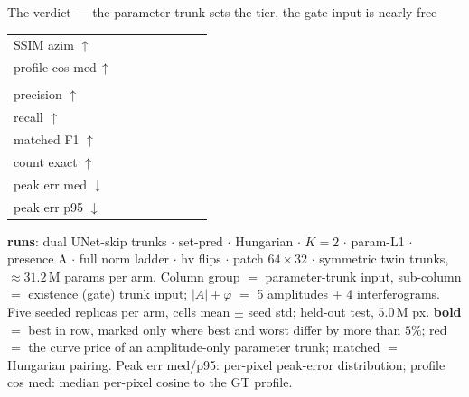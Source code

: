 \begin{frame}{The verdict --- the parameter trunk sets the tier, the gate input is nearly free}
\begin{tabular}{@{}l ccc !{\hspace{9pt}} cc !{\hspace{9pt}} cc@{}}
    SSIM azim $\uparrow$ &  &  &  &  &  &  &  \\
    profile cos med\,$\uparrow$ &  &  &  &  &  &  &  \\
    \addlinespace
     \\
    precision $\uparrow$ &  &  &  &  &  &  &  \\
    recall $\uparrow$ &  &  &  &  &  &  &  \\
    matched F1 $\uparrow$ &  &  &  &  &  &  &  \\
    count exact $\uparrow$ &  &  &  &  &  &  &  \\
    peak err med $\downarrow$ &  &  &  &  &  &  &  \\
    peak err p95 $\downarrow$ &  &  &  &  &  &  &  \\
    \bottomrule
    \end{tabular}
  \par\vspace{3pt}
  \parbox{0.82\textwidth}{\tiny\color{soft} \textbf{runs}: dual UNet-skip trunks $\cdot$ set-pred $\cdot$ Hungarian $\cdot$ $K{=}2$ $\cdot$ param-L1 $\cdot$ presence A $\cdot$ full norm ladder $\cdot$ hv flips $\cdot$ patch $64{\times}32$ $\cdot$ symmetric twin trunks, ${\approx}31.2$\,M params per arm. Column group $=$ parameter-trunk input, sub-column $=$ existence (gate) trunk input; $|A|{+}\varphi$ $=$ 5 amplitudes $+$ 4 interferograms. Five seeded replicas per arm, cells mean $\pm$ seed std; held-out test, $5.0$\,M px. \textbf{bold} $=$ best in row, marked only where best and worst differ by more than $5\%$; \textcolor{accent}{red} $=$ the curve price of an amplitude-only parameter trunk; matched $=$ Hungarian pairing. Peak err med/p95: per-pixel peak-error distribution; profile cos med: median per-pixel cosine to the GT profile.\par}
    

\end{frame}

